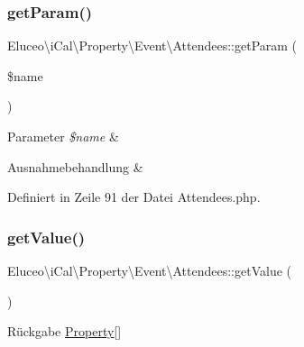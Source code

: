 \subsubsection{\texorpdfstring{get\+Param()}{getParam()}\hspace{0.1cm}{\footnotesize\ttfamily [3/3]}}
{\footnotesize\ttfamily Eluceo\textbackslash{}i\+Cal\textbackslash{}\+Property\textbackslash{}\+Event\textbackslash{}\+Attendees\+::get\+Param (\begin{DoxyParamCaption}\item[{}]{\$name }\end{DoxyParamCaption})}


\begin{DoxyParams}{Parameter}
{\em \$name} & \\
\hline
\end{DoxyParams}

\begin{DoxyExceptions}{Ausnahmebehandlung}
{\em } & \\
\hline
\end{DoxyExceptions}


Definiert in Zeile 91 der Datei Attendees.\+php.

\mbox{\label{class_eluceo_1_1i_cal_1_1_property_1_1_event_1_1_attendees_a17eed43b29bbf46dd988352929ff989b}} 
\subsubsection{\texorpdfstring{get\+Value()}{getValue()}\hspace{0.1cm}{\footnotesize\ttfamily [1/3]}}
{\footnotesize\ttfamily Eluceo\textbackslash{}i\+Cal\textbackslash{}\+Property\textbackslash{}\+Event\textbackslash{}\+Attendees\+::get\+Value (\begin{DoxyParamCaption}{ }\end{DoxyParamCaption})}

\begin{DoxyReturn}{Rückgabe}
\mbox{\hyperlink{class_eluceo_1_1i_cal_1_1_property}{Property}}\mbox{[}\mbox{]} 
\end{DoxyReturn}


